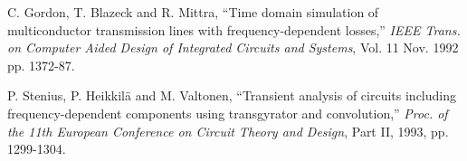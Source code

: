 \begin{thebibliography}{99}
 C. Gordon, T. Blazeck and R. Mittra, ``Time
domain simulation of multiconductor transmission lines with
frequency-dependent losses,'' \emph{IEEE Trans. on Computer
Aided Design of Integrated Circuits and Systems}, Vol. 11 Nov. 1992
pp. 1372-87.

 P. Stenius, P. Heikkil\"a and M. Valtonen,
``Transient analysis of circuits including frequency-dependent
components using transgyrator and convolution,''
\emph{Proc. of the 11th European Conference on Circuit Theory and
Design}, Part II, 1993, pp. 1299-1304.
\end{thebibliography}

